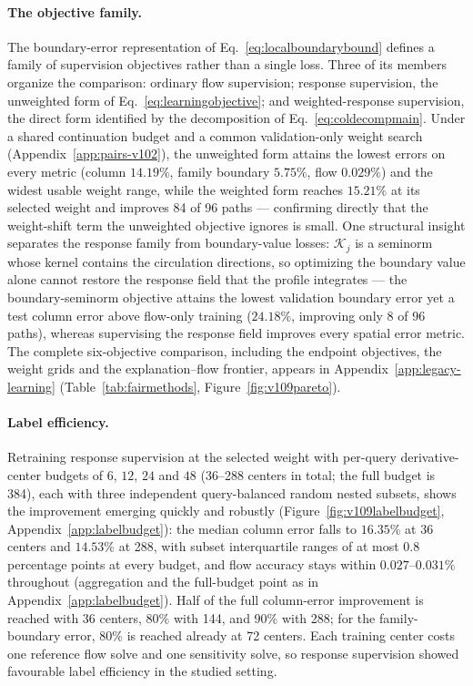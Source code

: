 \paragraph{The objective family.}
The boundary-error representation of
Eq.~\eqref{eq:localboundarybound} defines a family of supervision
objectives rather than a single loss. Three of its members organize the
comparison: ordinary flow supervision; response supervision, the
unweighted form of Eq.~\eqref{eq:learningobjective}; and
weighted-response supervision, the direct form identified by the
decomposition of Eq.~\eqref{eq:coldecompmain}. Under a shared
continuation budget and a common validation-only weight search
(Appendix~\ref{app:pairs-v102}), the unweighted form attains the lowest
errors on every metric (column $14.19\%$, family boundary $5.75\%$,
flow $0.029\%$) and the widest usable weight range, while the weighted
form reaches $15.21\%$ at its selected weight and improves 84 of 96
paths --- confirming directly that the weight-shift term the unweighted
objective ignores is small. One structural insight separates the
response family from boundary-value losses: $\mathcal K_j$ is a
seminorm whose kernel contains the circulation directions, so
optimizing the boundary value alone cannot restore the response field
that the profile integrates --- the boundary-seminorm objective attains
the lowest validation boundary error yet a test column error above
flow-only training ($24.18\%$, improving only 8 of 96 paths), whereas
supervising the response field improves every spatial error metric.
The complete six-objective comparison, including the endpoint
objectives, the weight grids and the explanation--flow frontier,
appears in Appendix~\ref{app:legacy-learning} (Table~\ref{tab:fairmethods},
Figure~\ref{fig:v109pareto}).

\paragraph{Label efficiency.}
Retraining response supervision at the selected weight with per-query
derivative-center budgets of $6$, $12$, $24$ and $48$ (36--288 centers
in total; the full budget is 384), each with three independent
query-balanced random nested subsets, shows the improvement emerging
quickly and robustly (Figure~\ref{fig:v109labelbudget},
Appendix~\ref{app:labelbudget}): the median
column error falls to $16.35\%$ at 36 centers and $14.53\%$ at 288,
with subset interquartile ranges of at most $0.8$ percentage points at
every budget, and flow accuracy stays within $0.027$--$0.031\%$
throughout (aggregation and the full-budget point as in
Appendix~\ref{app:labelbudget}). Half of the full column-error improvement is reached with
36 centers, $80\%$ with 144, and $90\%$ with 288; for the
family-boundary error, $80\%$ is reached already at 72 centers. Each
training center costs one reference flow solve and one sensitivity
solve, so response supervision showed favourable label efficiency in
the studied setting.
